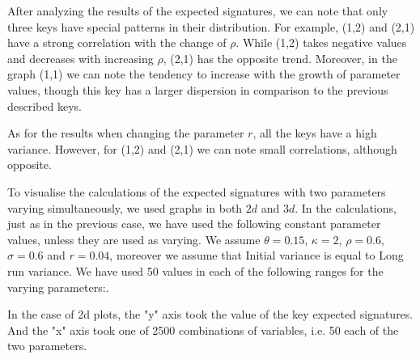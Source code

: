 \documentclass[12pt,a4paper]{report}
\theoremstyle{definition}
\begin{document}
After analyzing the results of the expected signatures, we can note that only three keys have special patterns in their distribution. For example, (1,2) and (2,1) have a strong correlation with the change of $\rho$. While (1,2) takes negative values and decreases with increasing $\rho$, (2,1) has the opposite trend. Moreover, in the graph (1,1) we can note the tendency to increase with the growth of parameter values, though this key has a larger dispersion in comparison to the previous described keys.

As for the results when changing the parameter $r$, all the keys have a high variance. However, for (1,2) and (2,1) we can note small correlations, although opposite.



To visualise the calculations of the expected signatures with two parameters varying simultaneously, we used graphs in both $2d$ and $3d$. In the calculations, just as in the previous case, we have used the following constant parameter values, unless they are used as varying. We assume $\theta=0.15$, $\kappa=2$, $\rho=0.6$, $\sigma=0.6$ and $r=0.04$, moreover we assume that Initial variance is equal to Long run variance. We have used 50 values in each of the following ranges for the varying parameters:.

In the case of 2d plots, the "y" axis took the value of the key expected signatures. And the "x" axis took one of 2500 combinations of variables, i.e. 50 each of the two parameters. 
\end{document}
